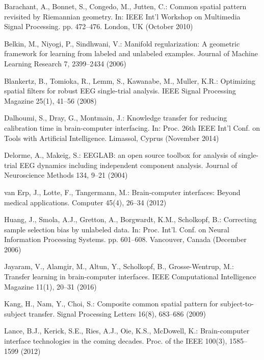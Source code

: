 \documentclass[runningheads]{llncs}
\begin{document}
\begin{thebibliography}{10}
\providecommand{\url}[1]{\texttt{#1}}
\providecommand{\urlprefix}{URL }

Barachant, A., Bonnet, S., Congedo, M., Jutten, C.: Common spatial pattern
  revisited by {R}iemannian geometry. In: {IEEE} Int'l Workshop on Multimedia
  Signal Processing. pp. 472--476. London, UK (October 2010)

Belkin, M., Niyogi, P., Sindhwani, V.: Manifold regularization: A geometric
  framework for learning from labeled and unlabeled examples. Journal of
  Machine Learning Research  7,  2399--2434 (2006)

Blankertz, B., Tomioka, R., Lemm, S., Kawanabe, M., Muller, K.R.: Optimizing
  spatial filters for robust {EEG} single-trial analysis. {IEEE} Signal
  Processing Magazine  25(1),  41--56 (2008)

Dalhoumi, S., Dray, G., Montmain, J.: Knowledge transfer for reducing
  calibration time in brain-computer interfacing. In: Proc. 26th {IEEE} Int'l
  Conf. on Tools with Artificial Intelligence. Limassol, Cyprus (November 2014)

Delorme, A., Makeig, S.: {EEGLAB}: an open source toolbox for analysis of
  single-trial {EEG} dynamics including independent component analysis. Journal
  of Neuroscience Methods  134,  9--21 (2004)

van Erp, J., Lotte, F., Tangermann, M.: Brain-computer interfaces: Beyond
  medical applications. Computer  45(4),  26--34 (2012)

Huang, J., Smola, A.J., Gretton, A., Borgwardt, K.M., Scholkopf, B.: Correcting
  sample selection bias by unlabeled data. In: Proc. Int'l. Conf. on Neural
  Information Processing Systems. pp. 601--608. Vancouver, Canada (December
  2006)

Jayaram, V., Alamgir, M., Altun, Y., Scholkopf, B., Grosse-Wentrup, M.:
  Transfer learning in brain-computer interfaces. {IEEE} Computational
  Intelligence Magazine  11(1),  20--31 (2016)

Kang, H., Nam, Y., Choi, S.: Composite common spatial pattern for
  subject-to-subject transfer. Signal Processing Letters  16(8),  683--686
  (2009)

Lance, B.J., Kerick, S.E., Ries, A.J., Oie, K.S., McDowell, K.: Brain-computer
  interface technologies in the coming decades. Proc. of the {IEEE}  100(3),
  1585--1599 (2012)


\end{thebibliography}
\end{document}
